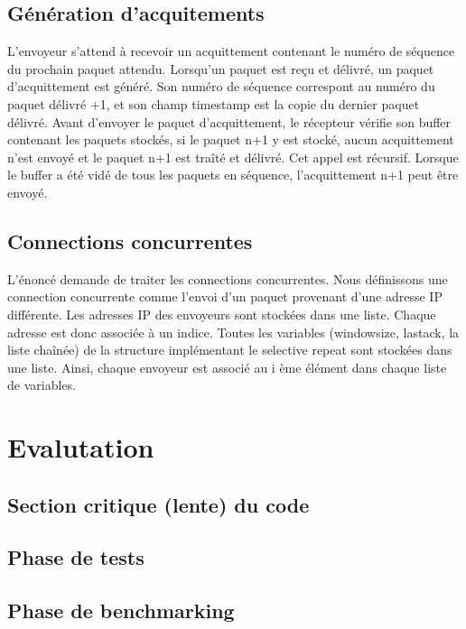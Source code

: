 \documentclass{article}
\begin{document}
\subsection{Génération d'acquitements}
L'envoyeur s'attend à recevoir un acquittement contenant le numéro de séquence du prochain paquet attendu. Lorsqu'un paquet est reçu et délivré, un paquet d'acquittement est généré. Son numéro de séquence correspont au numéro du paquet délivré +1, et son champ timestamp est la copie du dernier paquet délivré.
Avant d'envoyer le paquet d'acquittement, le récepteur vérifie son buffer contenant les paquets stockés, si le paquet n+1 y est stocké, aucun acquittement n'est envoyé et le paquet n+1 est traîté et délivré. Cet appel est récursif. Lorsque le buffer a été vidé de tous les paquets en séquence, l'acquittement n+1 peut être envoyé.
\subsection{Connections concurrentes}
L'énoncé demande de traiter les connections concurrentes. Nous définissons une connection concurrente comme l'envoi d'un paquet provenant d'une adresse IP différente. Les adresses IP des envoyeurs sont stockées dans une liste. Chaque adresse est donc associée à un indice. Toutes les variables (windowsize, lastack, la liste chaînée) de la structure implémentant le selective repeat sont stockées dans une liste. Ainsi, chaque envoyeur est associé au i ème élément dans chaque liste de variables.

\section{Evalutation}

\subsection{Section critique (lente) du code}
\subsection{Phase de tests}

\subsection{Phase de benchmarking}
\end{document}
